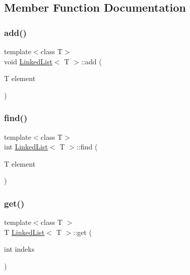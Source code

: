 \subsection{Member Function Documentation}
\mbox{\label{classLinkedList_ab7364799e5965dd59d4f5952cb953287}} 
\subsubsection{\texorpdfstring{add()}{add()}}
{\footnotesize\ttfamily template$<$class T$>$ \\
void \mbox{\hyperlink{classLinkedList}{Linked\+List}}$<$ T $>$\+::add (\begin{DoxyParamCaption}\item[{T}]{element }\end{DoxyParamCaption})}

\mbox{\label{classLinkedList_a924e217dd525b84492e9f0dc61db96bc}} 
\subsubsection{\texorpdfstring{find()}{find()}}
{\footnotesize\ttfamily template$<$class T$>$ \\
int \mbox{\hyperlink{classLinkedList}{Linked\+List}}$<$ T $>$\+::find (\begin{DoxyParamCaption}\item[{T}]{element }\end{DoxyParamCaption})}

\mbox{\label{classLinkedList_a0f812c8aa5443a800c4e3c4bcb5542fa}} 
\subsubsection{\texorpdfstring{get()}{get()}}
{\footnotesize\ttfamily template$<$class T $>$ \\
T \mbox{\hyperlink{classLinkedList}{Linked\+List}}$<$ T $>$\+::get (\begin{DoxyParamCaption}\item[{int}]{indeks }\end{DoxyParamCaption})}

